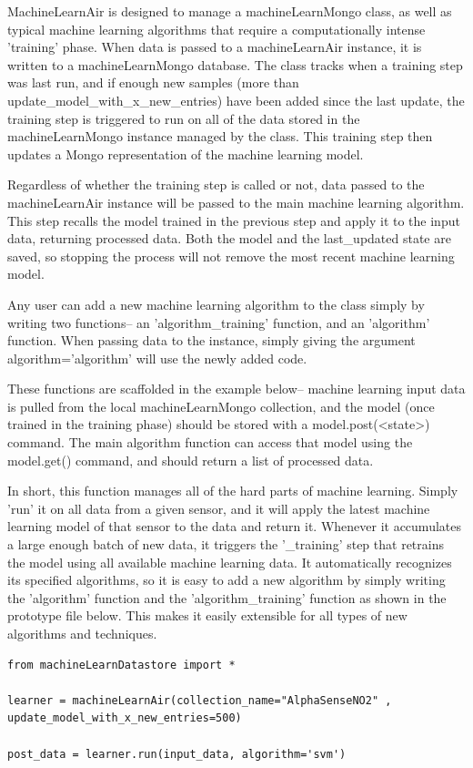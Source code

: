 MachineLearnAir is designed to manage a machineLearnMongo class, as well as typical machine learning algorithms that require a computationally intense 'training' phase.  When data is passed to a machineLearnAir instance, it is written to a machineLearnMongo database.  The class tracks when a training step was last run, and if enough new samples (more than update\_model\_with\_x\_new\_entries) have been added since the last update, the training step is triggered to run on all of the data stored in the machineLearnMongo instance managed by the class.  This training step then updates a Mongo representation of the machine learning model.

Regardless of whether the training step is called or not, data passed to the machineLearnAir instance will be passed to the main machine learning algorithm.  This step recalls the model trained in the previous step and apply it to the input data, returning processed data.  Both the model and the last\_updated state are saved, so stopping the process will not remove the most recent machine learning model.

Any user can add a new machine learning algorithm to the class simply by writing two functions-- an 'algorithm\_training' function, and an 'algorithm' function.  When passing data to the instance, simply giving the argument algorithm='algorithm' will use the newly added code.

These functions are scaffolded in the example below-- machine learning input data is pulled from the local machineLearnMongo collection, and the model (once trained in the training phase) should be stored with a model.post(<state>) command.  The main algorithm function can access that model using the model.get() command, and should return a list of processed data.

In short, this function manages all of the hard parts of machine learning.  Simply 'run' it on all data from a given sensor, and it will apply the latest machine learning model of that sensor to the data and return it.  Whenever it accumulates a large enough batch of new data, it triggers the '\_training' step that retrains the model using all available machine learning data.  It automatically recognizes its specified algorithms, so it is easy to add a new algorithm by simply writing the 'algorithm' function and the 'algorithm\_training' function as shown in the prototype file below. This makes it easily extensible for all types of new algorithms and techniques.
   

\begin{lstlisting}[style=code]
from machineLearnDatastore import *

learner = machineLearnAir(collection_name="AlphaSenseNO2" , update_model_with_x_new_entries=500)  

post_data = learner.run(input_data, algorithm='svm')
\end{lstlisting}

